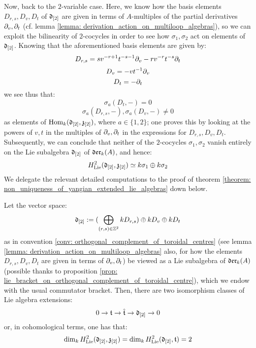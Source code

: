 \begin{remark}
            Now, back to the $2$-variable case. Here, we know how the basis elements $D_{r, s}, D_v, D_t$ of $\mathfrak{d}_{[2]}$ are given in terms of $A$-multiples of the partial derivatives $\partial_v, \partial_t$ (cf. lemma \ref{lemma: derivation_action_on_multiloop_algebras}), so we can exploit the bilinearity of $2$-cocycles in order to see how $\sigma_1, \sigma_2$ act on elements of $\mathfrak{d}_{[2]}$. Knowing that the aforementioned basis elements are given by:
                $$D_{r, s} = s v^{-r + 1} t^{-s - 1} \partial_v - r v^{-r} t^{-s} \partial_t$$
                $$D_v = -v t^{-1} \partial_v$$
                $$D_t = -\partial_t$$
            we see thus that:
                $$\sigma_a(D_t, -) = 0$$
                $$\sigma_a(D_{r, s}, -), \sigma_a(D_v, -) \not = 0$$
            as elements of $\mathrm{Hom}_{k}(\mathfrak{d}_{[2]}, \mathfrak{z}_{[2]})$, where $a \in \{1, 2\}$; one proves this by looking at the powers of $v, t$ in the multiples of $\partial_v, \partial_t$ in the expressions for $D_{r, s}, D_v, D_t$. Subsequently, we can conclude that neither of the $2$-cocycles $\sigma_1, \sigma_2$ vanish entirely on the Lie subalgebra $\mathfrak{d}_{[2]}$ of $\mathfrak{der}_{k}(A)$, and hence:
                $$H^2_{\mathrm{Lie}}(\mathfrak{d}_{[2]}, \mathfrak{z}_{[2]}) \simeq k \sigma_1 \oplus k \sigma_2$$
            We delegate the relevant detailed computations to the proof of theorem \ref{theorem: non_uniqueness_of_yangian_extended_lie_algebras} down below.  
        \end{remark}
        \begin{theorem} \label{theorem: non_uniqueness_of_yangian_extended_lie_algebras}
            Let the vector space:
                $$\mathfrak{d}_{[2]} := (\bigoplus_{(r, s) \in \mathbb{Z}^2} k D_{r, s}) \oplus k D_v \oplus k D_t$$
            as in convention \ref{conv: orthogonal_complement_of_toroidal_centres} (see lemma \ref{lemma: derivation_action_on_multiloop_algebras} also, for how the elements $D_{r, s}, D_v, D_t$ are given in terms of $\partial_v, \partial_t$) be viewed as a Lie subalgebra of $\mathfrak{der}_{k}(A)$ (possible thanks to proposition \ref{prop: lie_bracket_on_orthogonal_complement_of_toroidal_centre}), which we endow with the usual commutator bracket. Then, there are two isomorphism classes of Lie algebra extensions:
                $$0 \to \mathfrak{t} \to \hat{\mathfrak{t}} \to \mathfrak{d}_{[2]} \to 0$$
            or, in cohomological terms, one has that:
                $$\dim_{k} H^2_{\mathrm{Lie}}(\mathfrak{d}_{[2]}, \mathfrak{z}_{[2]}) = \dim_{k} H^2_{\mathrm{Lie}}(\mathfrak{d}_{[2]}, \mathfrak{t}) = 2$$
        \end{theorem}
